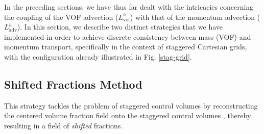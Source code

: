 

In the preceding sections, we have thus far dealt with the 
intricacies concerning the coupling of the VOF advection ($L^{h}_{\textrm{vof}}$)  
with that of the momentum advection ($L^{h}_{\textrm{adv}}$). In this section, we
describe two distinct strategies that we have implemented in order to achieve 
discrete consistency between mass (VOF) and momentum transport, specifically 
in the context of staggered Cartesian grids, with the configuration
already illustrated in Fig. \ref{stag-grid}. 


\subsection*{Shifted Fractions Method}

This strategy tackles the problem of staggered control volumes by reconstructing 
the centered volume fraction field onto the staggered control volumes 
, thereby resulting in a field of \textit{shifted} fractions. 


